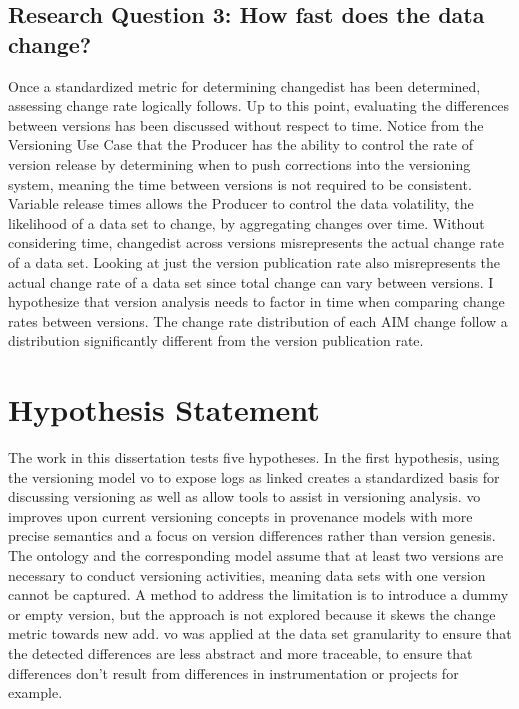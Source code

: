 \subsection{Research Question 3: How fast does the data change?}

Once a standardized metric for determining \gls{changedist} has been determined, assessing change rate logically follows.
Up to this point, evaluating the differences between versions has been discussed without respect to time.
Notice from the Versioning Use Case that the Producer has the ability to control the rate of version release by determining when to push corrections into the versioning system, meaning the time between \glspl{version} is not required to be consistent.
Variable release times allows the Producer to control the data volatility, the likelihood of a data set to change, by aggregating changes over time.
Without considering time, \gls{changedist} across \glspl{version} misrepresents the actual change rate of a data set.
Looking at just the version publication rate also misrepresents the actual change rate of a data set since total change can vary between \glspl{version}.
I hypothesize that version analysis needs to factor in time when comparing change rates between \glspl{version}.
The change rate distribution of each \gls{AIM} \gls{change} follow a distribution significantly different from the version publication rate.

\section{Hypothesis Statement}

The work in this dissertation tests five hypotheses.
In the first hypothesis, using the versioning model \gls{vo} to expose \glspl{log} as \gls{linked} creates a standardized basis for discussing versioning as well as allow tools to assist in versioning analysis.
\gls{vo} improves upon current versioning concepts in provenance models with more precise semantics and a focus on version differences rather than version genesis.
The ontology and the corresponding model assume that at least two \glspl{version} are necessary to conduct versioning activities, meaning data sets with one \gls{version} cannot be captured.
A method to address the limitation is to introduce a dummy or empty \gls{version}, but the approach is not explored because it skews the change metric towards new \gls{add}.
\gls{vo} was applied at the data set granularity to ensure that the detected differences are less abstract and more traceable, to ensure that differences don't result from differences in instrumentation or projects for example.

